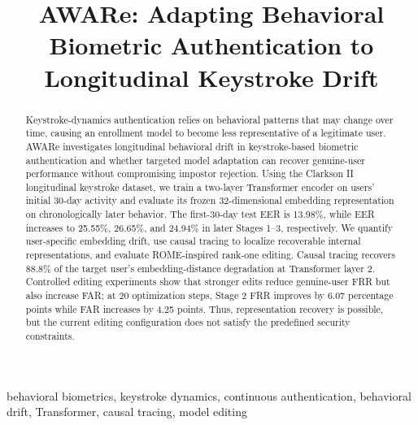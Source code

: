 \documentclass[conference]{IEEEtran}
\begin{document}
\title{AWARe: Adapting Behavioral Biometric Authentication to Longitudinal Keystroke Drift}

\author{
}

\maketitle


\begin{abstract}
Keystroke-dynamics authentication relies on behavioral patterns that may change over time, causing an enrollment model to become less representative of a legitimate user. AWARe investigates longitudinal behavioral drift in keystroke-based biometric authentication and whether targeted model adaptation can recover genuine-user performance without compromising impostor rejection. Using the Clarkson II longitudinal keystroke dataset, we train a two-layer Transformer encoder on users' initial 30-day activity and evaluate its frozen 32-dimensional embedding representation on chronologically later behavior. The first-30-day test EER is 13.98\%, while EER increases to 25.55\%, 26.65\%, and 24.94\% in later Stages 1--3, respectively. We quantify user-specific embedding drift, use causal tracing to localize recoverable internal representations, and evaluate ROME-inspired rank-one editing. Causal tracing recovers 88.8\% of the target user's embedding-distance degradation at Transformer layer 2. Controlled editing experiments show that stronger edits reduce genuine-user FRR but also increase FAR; at 20 optimization steps, Stage 2 FRR improves by 6.07 percentage points while FAR increases by 4.25 points. Thus, representation recovery is possible, but the current editing configuration does not satisfy the predefined security constraints.
\end{abstract}

\begin{IEEEkeywords}
behavioral biometrics, keystroke dynamics, continuous authentication, behavioral drift, Transformer, causal tracing, model editing
\end{IEEEkeywords}
\end{document}
